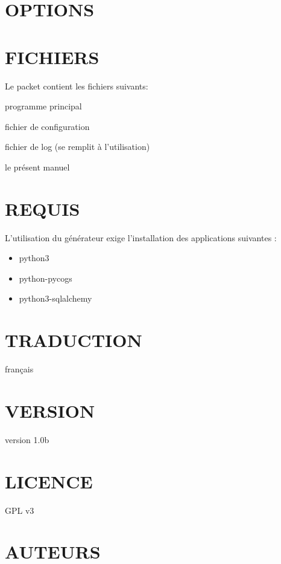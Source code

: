 \documentclass[a4paper,notitlepage,11pt]{article}
\begin{document}
\section{OPTIONS}


\section{FICHIERS}
\begin{description}
Le packet contient les fichiers suivants:
\item[main.py -] programme principal
\item[config.py -] fichier de configuration
\item[playlist.log -] fichier de log (se remplit à l'utilisation)
\item[docs/manual.pdf -] le présent manuel
\end{description}

\section{REQUIS}
L'utilisation du générateur exige l'installation des applications suivantes :
\begin{itemize}
\item python3
\item python-pycogs
\item python3-sqlalchemy
\end{itemize}

\section{TRADUCTION}
français

\section{VERSION}
version 1.0b

\section{LICENCE}
GPL v3

\section{AUTEURS}
\end{document}
